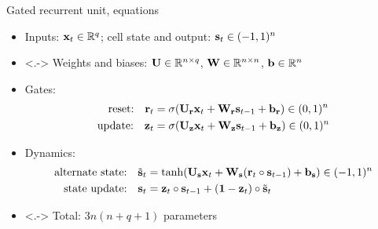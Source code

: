 \begin{frame}{Gated recurrent unit, equations}
    \begin{itemize}
        \item<+-> Inputs: $\mathbf{x}_t \in \mathbb{R}^q$; cell state and output: $\mathbf{s}_t \in (-1, 1)^n$
        \item<.-> Weights and biases: $\mathbf{U} \in \mathbb{R}^{n \times q}$, $\mathbf{W} \in \mathbb{R}^{n \times n}$, $\mathbf{b} \in \mathbb{R}^n$
        \item<+-> Gates:
        \begin{align*}
            \text{reset:} \quad \mathbf{r}_t &= \sigma(\mathbf{U}_{\mathbf{r}} \mathbf{x}_t + \mathbf{W}_{\mathbf{r}} \mathbf{s}_{t-1} + \mathbf{b}_{\mathbf{r}}) \in (0, 1)^n \\
            \text{update:} \quad \mathbf{z}_t &= \sigma(\mathbf{U}_{\mathbf{z}} \mathbf{x}_t + \mathbf{W}_{\mathbf{z}} \mathbf{s}_{t-1} + \mathbf{b}_{\mathbf{z}}) \in (0, 1)^n
        \end{align*}
        \item<+-> Dynamics:
        \begin{align*}
            \text{alternate state:} \quad \tilde{\mathbf{s}}_t &= \tanh(\mathbf{U}_{\mathbf{s}} \mathbf{x}_t + \mathbf{W}_{\mathbf{s}} (\mathbf{r}_t \circ \mathbf{s}_{t-1}) + \mathbf{b}_{\mathbf{s}}) \in (-1, 1)^n \\
            \text{state update:} \quad \mathbf{s}_t &= \mathbf{z}_t \circ \mathbf{s}_{t-1} + (\mathbf{1} - \mathbf{z}_t) \circ \tilde{\mathbf{s}}_t
        \end{align*}
        \item<.-> Total: $3 n (n + q + 1)$ parameters
    \end{itemize}
\end{frame}

